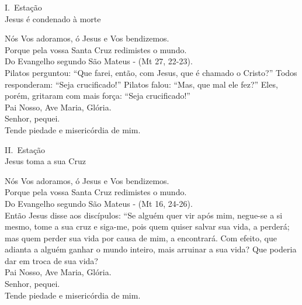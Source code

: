 \documentclass{book}
\begin{document}
\begin{center}
    I.\ Estação \\ Jesus é condenado à morte
\end{center}
\begin{flushleft}
    \VbarRed{} Nós Vos adoramos, ó Jesus e Vos bendizemos. \\
    \RbarRed{} Porque pela vossa Santa Cruz redimistes o mundo.
    \vspace{.2cm} \\
    Do Evangelho segundo São Mateus - (\textcolor{VioletRed2}{Mt 27, 22-23}).
    \vspace{.2cm} \\
    Pilatos perguntou: ``Que farei, então, com Jesus, que é chamado o Cristo?'' Todos responderam: ``Seja crucificado!'' Pilatos falou: ``Mas, que mal ele fez?'' Eles, porém, gritaram com mais força: ``Seja crucificado!''
    \vspace{.2cm} \\
    Pai Nosso, Ave Maria, Glória.
    \vspace{.2cm} \\
    \VbarRed{} Senhor, pequei. \\
    \RbarRed{} Tende piedade e misericórdia de mim.
\end{flushleft}
\begin{center}
    II.\ Estação \\ Jesus toma a sua Cruz
\end{center}
\begin{flushleft}
    \VbarRed{} Nós Vos adoramos, ó Jesus e Vos bendizemos. \\
    \RbarRed{} Porque pela vossa Santa Cruz redimistes o mundo.
    \vspace{.2cm} \\
    Do Evangelho segundo São Mateus - (\textcolor{VioletRed2}{Mt 16, 24-26}).
    \vspace{.2cm} \\
    Então Jesus disse aos discípulos: ``Se alguém quer vir após mim, negue-se a si mesmo, tome a sua cruz e siga-me, pois quem quiser salvar sua vida, a perderá; mas quem perder sua vida por causa de mim, a encontrará. Com efeito, que adianta a alguém ganhar o mundo inteiro, mais arruinar a sua vida? Que poderia dar em troca de sua vida?
    \vspace{.2cm} \\
    Pai Nosso, Ave Maria, Glória.
    \vspace{.2cm} \\
    \VbarRed{} Senhor, pequei. \\
    \RbarRed{} Tende piedade e misericórdia de mim.
\end{flushleft}
\end{document}
